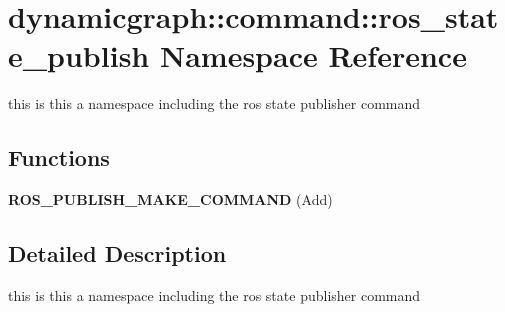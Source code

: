 \hypertarget{namespacedynamicgraph_1_1command_1_1ros__state__publish}{}\section{dynamicgraph\+:\+:command\+:\+:ros\+\_\+state\+\_\+publish Namespace Reference}
\label{namespacedynamicgraph_1_1command_1_1ros__state__publish}


this is this a namespace including the ros state publisher command  


\subsection*{Functions}
\begin{DoxyCompactItemize}
\item 
\mbox{\label{namespacedynamicgraph_1_1command_1_1ros__state__publish_afda3d72cc97dc1e2e41f454faa40f814}} 
{\bfseries R\+O\+S\+\_\+\+P\+U\+B\+L\+I\+S\+H\+\_\+\+M\+A\+K\+E\+\_\+\+C\+O\+M\+M\+A\+ND} (Add)
\end{DoxyCompactItemize}


\subsection{Detailed Description}
this is this a namespace including the ros state publisher command 